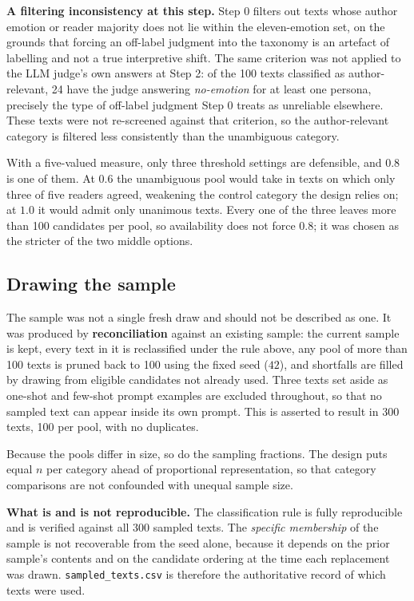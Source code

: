 \textbf{A filtering inconsistency at this step.} Step 0 filters out texts whose author emotion or
reader majority does not lie within the eleven-emotion set, on the grounds that forcing an
off-label judgment into the taxonomy is an artefact of labelling and not a true interpretive
shift. The same criterion was not applied to the LLM judge's own answers at Step 2: of the 100
texts classified as author-relevant, 24 have the judge answering \emph{no-emotion} for at least
one persona, precisely the type of off-label judgment Step 0 treats as unreliable elsewhere. These
texts were not re-screened against that criterion, so the author-relevant category is filtered
less consistently than the unambiguous category.

With a five-valued measure, only three threshold settings are defensible, and $0.8$ is one of
them. At $0.6$ the unambiguous pool would take in texts on which only three of five readers agreed,
weakening the control category the design relies on; at $1.0$ it would admit only unanimous
texts. Every one of the three leaves more than 100 candidates per pool, so availability does not
force $0.8$; it was chosen as the stricter of the two middle options.

\subsection{Drawing the sample}
\label{meth:sampling}

\noindent
The sample was not a single fresh draw and should not be described as one. It was
produced by \textbf{reconciliation} against an existing sample: the current sample is kept, every
text in it is reclassified under the rule above, any pool of more than 100 texts is pruned back to
100 using the fixed seed ($42$), and shortfalls are filled by drawing from eligible candidates not
already used. Three texts set aside as one-shot and few-shot prompt examples are excluded
throughout, so that no sampled text can appear inside its own prompt. This is asserted to result
in 300 texts, 100 per pool, with no duplicates.

Because the pools differ in size, so do the sampling fractions. The design puts equal $n$ per
category ahead of proportional representation, so that category comparisons are not confounded
with unequal sample size.

\textbf{What is and is not reproducible.} The classification rule is fully reproducible and is
verified against all 300 sampled texts. The \emph{specific membership} of the sample is not
recoverable from the seed alone, because it depends on the prior sample's contents and on the
candidate ordering at the time each replacement was drawn. \texttt{sampled\_texts.csv} is
therefore the authoritative record of which texts were used.

